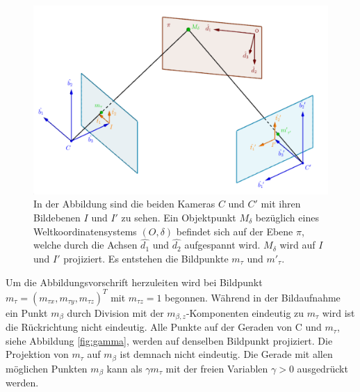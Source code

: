 \begin{figure}[!htb]
	\centering
	\includegraphics[width=0.8\linewidth]{images/HomographieDP_beschriftet.png}
	\caption[Abbildungsvorschrift mit Homographien]{In der Abbildung sind die beiden Kameras $C$ und $C'$ mit ihren Bildebenen $I$ und $I'$ zu sehen. Ein Objektpunkt $M_\delta$ bezüglich eines Weltkoordinatensystems $(O,\delta)$ befindet sich auf der Ebene $\pi$, welche durch die Achsen $\hat{d_1}$ und $\hat{d_2}$ aufgespannt wird. $M_\delta$ wird auf $I$ und $I'$ projiziert. Es entstehen die Bildpunkte $m_\tau$ und $m'_\tau$.}  
	\label{fig:Homographie}
\end{figure}


Um die Abbildungsvorschrift herzuleiten wird bei  Bildpunkt \ensuremath{m_{\tau} = (m_{\tau x},m_{\tau y},m_{\tau z})^T} mit $m_{\tau z}=1$ begonnen. Während in der Bildaufnahme ein Punkt $m_\beta$ durch Division mit der $m_{\beta,z}$-Komponenten eindeutig zu $m_{\tau}$ wird ist die Rückrichtung nicht eindeutig. Alle Punkte auf der Geraden von C und $m_{\tau}$, siehe Abbildung \ref{fig:gamma}, werden auf denselben Bildpunkt projiziert. Die Projektion von $m_{\tau}$ auf $m_\beta$ ist demnach nicht eindeutig. Die Gerade mit allen möglichen Punkten $m_\beta$ kann als $\gamma m_{\tau}$ mit der freien Variablen $\gamma > 0$ ausgedrückt werden.  




